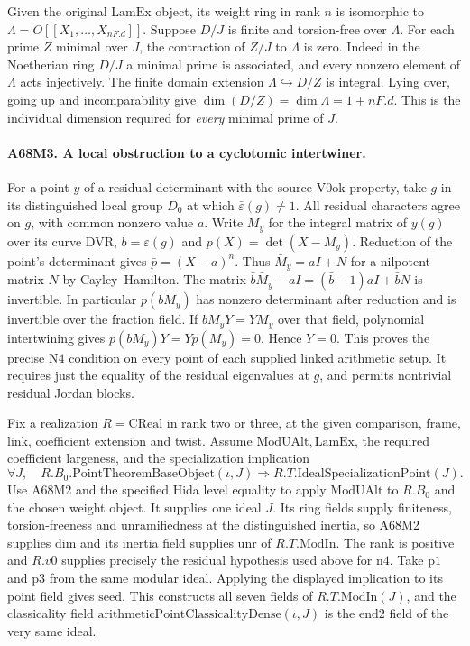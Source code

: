 Given the original $\mathrm{LamEx}$ object, its weight ring in
rank $n$ is isomorphic to $\Lambda=O[[X_1,\dots,X_{nF.d}]]$.
Suppose $D/J$ is finite and torsion-free over $\Lambda$. For each
prime $Z$ minimal over $J$, the contraction of $Z/J$ to $\Lambda$
is zero. Indeed in the Noetherian ring $D/J$ a minimal prime is
associated, and every nonzero element of $\Lambda$ acts injectively.
The finite domain extension $\Lambda\hookrightarrow D/Z$ is integral.
Lying over, going up and incomparability give
$\dim(D/Z)=\dim\Lambda=1+nF.d$. This is the individual dimension
required for \emph{every} minimal prime of $J$.

\paragraph{A68M3. A local obstruction to a cyclotomic intertwiner.}
For a point $y$ of a residual determinant with the source
$\mathrm{V0ok}$ property, take $g$ in its distinguished local group
$D_0$ at which $\bar\varepsilon(g)\ne1$. All residual characters
agree on $g$, with common nonzero value $a$. Write $M_y$ for the
integral matrix of $y(g)$ over its curve DVR, $b=\varepsilon(g)$
and $p(X)=\det(X-M_y)$. Reduction of the point's determinant gives
$\bar p=(X-a)^n$. Thus $\bar M_y=aI+N$ for a nilpotent matrix
$N$ by Cayley--Hamilton. The matrix
$\bar b\bar M_y-aI=(\bar b-1)aI+\bar bN$ is invertible.
In particular $p(bM_y)$ has nonzero determinant after reduction
and is invertible over the fraction field. If $bM_yY=YM_y$ over
that field, polynomial intertwining gives
$p(bM_y)Y=Yp(M_y)=0$. Hence $Y=0$. This proves the precise
$\mathrm{N4}$ condition on every point of each supplied linked
arithmetic setup. It requires just the equality of the residual
eigenvalues at $g$, and permits nontrivial residual Jordan blocks.

Fix a realization $R=\mathrm{CReal}$ in rank two or three, at the
given comparison, frame, link, coefficient extension and twist.
Assume $\mathrm{ModUAlt},\mathrm{LamEx}$, the required coefficient
largeness, and the specialization implication
\[
 \forall J,\quad R.B_0.\mathrm{PointTheoremBaseObject}(\iota,J)
             \Longrightarrow R.T.\mathrm{IdealSpecializationPoint}(J).
\]
Use A68M2 and the specified Hida level equality to apply
$\mathrm{ModUAlt}$ to $R.B_0$ and the chosen weight object.
It supplies one ideal $J$. Its ring fields supply finiteness,
torsion-freeness and unramifiedness at the distinguished inertia,
so A68M2 supplies $\mathrm{dim}$ and its inertia field supplies
$\mathrm{unr}$ of $R.T.\mathrm{ModIn}$. The rank is positive
and $R.v0$ supplies precisely the residual hypothesis used above
for $\mathrm{n4}$. Take $\mathrm{p1}$ and $\mathrm{p3}$ from the
same modular ideal. Applying the displayed implication to its point
field gives $\mathrm{seed}$. This constructs all seven fields of
$R.T.\mathrm{ModIn}(J)$, and the classicality field
$\mathrm{arithmeticPointClassicalityDense}(\iota,J)$ is the
$\mathrm{end2}$ field of the very same ideal.

